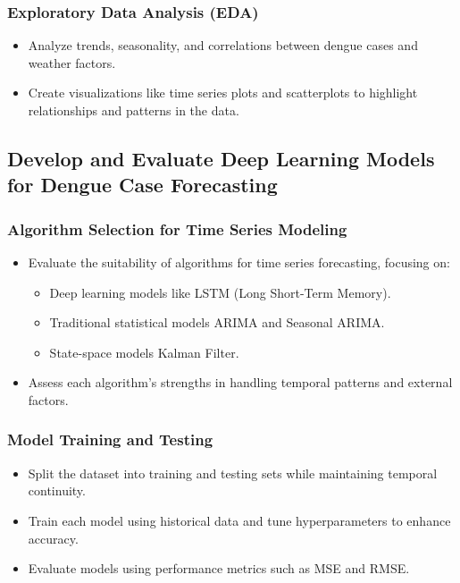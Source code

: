 \subsubsection{Exploratory Data Analysis (EDA)}
\begin{itemize}
	\item Analyze trends, seasonality, and correlations between dengue cases and weather factors.
	\item Create visualizations like time series plots and scatterplots to highlight relationships and patterns in the data.
\end{itemize}

\subsection{Develop and Evaluate Deep Learning Models for Dengue Case Forecasting}

\subsubsection{Algorithm Selection for Time Series Modeling}
\begin{itemize}
	\item Evaluate the suitability of algorithms for time series forecasting, focusing on:
	\begin{itemize}
		\item Deep learning models like LSTM (Long Short-Term Memory).
		\item Traditional statistical models ARIMA and Seasonal ARIMA.
		\item State-space models Kalman Filter.
	\end{itemize}
	\item Assess each algorithm's strengths in handling temporal patterns and external factors.
\end{itemize}

\subsubsection{Model Training and Testing}
\begin{itemize}
	\item Split the dataset into training and testing sets while maintaining temporal continuity.
	\item Train each model using historical data and tune hyperparameters to enhance accuracy.
	\item Evaluate models using performance metrics such as MSE and RMSE.
\end{itemize}


